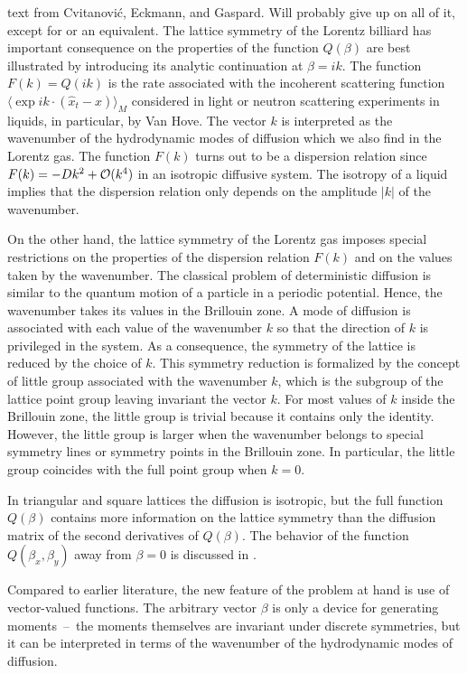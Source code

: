     {text from Cvitanovi\'c,  Eckmann, and Gaspard.
    Will probably give up on all of it, except for 
    or an equivalent.}
The lattice symmetry of the Lorentz billiard has important consequence on
the properties of the function $Q(\beta)$ are best illustrated by
introducing its analytic continuation at $\beta = i k$.  The function
$F(k)=Q(ik)$ is the rate associated with the incoherent scattering
function $\langle \exp i k \cdot (\hat x_t - x) \rangle_M$ considered in
light or neutron scattering experiments in liquids, in particular, by Van
Hove. The vector $k$ is interpreted as the
wavenumber of the hydrodynamic modes of diffusion which we also find in
the Lorentz gas.  The function $F(k)$ turns out to be a dispersion
relation since $F(k)=-D k^2 + {\cal O}(k^4)$ in an isotropic diffusive
system.  The isotropy of a liquid implies that the dispersion relation
only depends on the amplitude $\vert k\vert$ of the wavenumber.

On the other hand, the lattice symmetry of the Lorentz gas
imposes special restrictions on the properties of the dispersion relation
$F(k)$ and on the values taken by the wavenumber.  The classical
problem of deterministic diffusion is similar to the quantum motion of a particle in a
periodic potential.  Hence, the wavenumber takes its values in the
Brillouin zone.  A mode of diffusion is associated with each value of
the wavenumber $k$ so that the direction of $k$ is privileged in the
system.  As a consequence, the symmetry of the lattice is reduced by the choice
of $k$.  This symmetry reduction is formalized by the concept of little group
associated with the wavenumber $k$, which is the subgroup of the lattice point
group leaving invariant the vector $k$.  For most values of $k$ inside the
Brillouin zone, the little group is trivial because it contains only the
identity.  However, the little group is larger when the wavenumber belongs to
special symmetry lines or symmetry points in the Brillouin zone.  In particular,
the little group coincides with the full point group when $k=0$.

In triangular and square lattices the diffusion is isotropic, but the
full function $Q(\beta)$ contains more information on the lattice
symmetry than the diffusion matrix of the second derivatives of
$Q(\beta)$. The behavior of the function $Q(\beta_x, \beta_y)$ away from
$\beta=0$ is discussed in . 

Compared to earlier literature, the new feature of the
problem at hand is use of vector-valued functions. The arbitrary vector
$\beta$ is only a device for generating moments~--~the moments themselves
are invariant under discrete symmetries, but it can be interpreted in
terms of the wavenumber of the hydrodynamic modes of diffusion.

    \fi %
